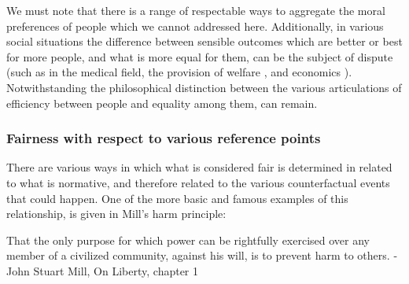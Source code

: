 We must note that there is a range of respectable ways to aggregate the moral preferences of people which we cannot addressed here.
Additionally, in various social situations the difference between sensible outcomes which are better or best for more people, and what is more equal for them, can be the subject of dispute (such as in the medical field\cite{Reidpath2012,RePEc:chy:respap:120cherp}, the provision of welfare \cite{10.2307/27522452}, and economics \cite{10.1093/oep/gpz040}). Notwithstanding the philosophical distinction between the various articulations of efficiency between people and equality among them, can remain.



\subsubsection{Fairness with respect to various reference points}\label{sec:reference_points}

There are various ways in which what is considered fair is determined in related to what is normative, and therefore related to the various counterfactual events that could happen.
One of the more basic and famous examples of this relationship, is given in Mill's harm principle:

\begin{displayquote}
That the only purpose for which power can be rightfully exercised over any member of a civilized community, against his will, is to prevent harm to others. - John Stuart Mill, On Liberty, chapter 1 \cite{Mill2Gutenberg}
\end{displayquote}

